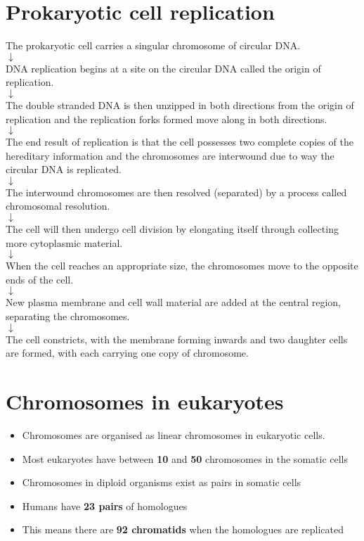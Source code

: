 \documentclass[11pt]{article}
\begin{document}
\section{Prokaryotic cell replication}
\label{sec:org3a50b2f}
\begin{center}
The prokaryotic cell carries a singular chromosome of circular DNA. \\
$\downarrow$ \\
DNA replication begins at a site on the circular DNA called the origin of replication. \\
$\downarrow$ \\
The double stranded DNA is then unzipped in both directions from the origin of replication and the replication forks formed move along in both directions. \\
$\downarrow$ \\
The end result of replication is that the cell possesses two complete copies of the hereditary information and the chromosomes are interwound due to way the circular DNA is replicated. \\
$\downarrow$ \\
The interwound chromosomes are then resolved (separated) by a process called chromosomal resolution. \\
$\downarrow$ \\
The cell will then undergo cell division by elongating itself through collecting more cytoplasmic material. \\
$\downarrow$ \\
When the cell reaches an appropriate size, the chromosomes move to the opposite ends of the cell. \\
$\downarrow$ \\
New plasma membrane and cell wall material are added at the central region, separating the chromosomes. \\
$\downarrow$ \\
The cell constricts, with the membrane forming inwards and two daughter cells are formed, with each carrying one copy of chromosome.
\end{center}

\newpage
\section{Chromosomes in eukaryotes}
\label{sec:org2d5b50b}
\begin{itemize}
\item Chromosomes are organised as linear chromosomes in eukaryotic cells.
\item Most eukaryotes have between \textbf{10} and \textbf{50} chromosomes in the somatic cells
\item Chromosomes in diploid organisms exist as pairs in somatic cells
\item Humans have \textbf{23 pairs} of homologues
\item This means there are \textbf{92 chromatids} when the homologues are replicated
\end{itemize}
\end{document}

